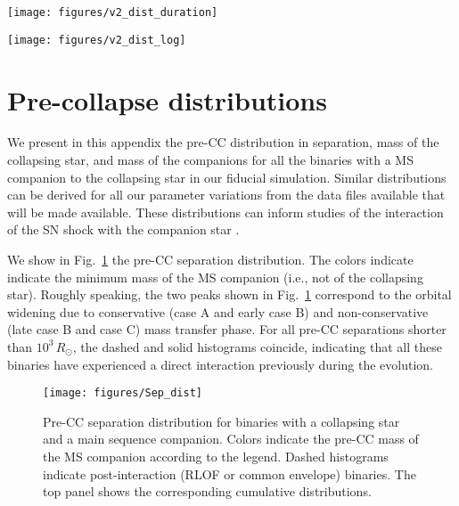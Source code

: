 \documentclass{aa}
\newcommand{\todo}[1]{{\large $\blacksquare$~\textbf{\color{red}[#1]}}~$\blacksquare$}
\DeclareRobustCommand{\Figref}[1]{Fig.~\ref{#1}}
\begin{document}
\begin{figure*}[htbp]
  \texttt{[image: figures/v2\_dist\_duration]}
  \caption{Velocity distribution of ejected stars, including the
    finite MS lifetime to populate the bins (see also
    \Figref{fig:v_dist}). }
  \label{fig:v_dist_obs}
\end{figure*}


\begin{figure*}[bp]
  \texttt{[image: figures/v2\_dist\_log]}
  \caption{Same as \Figref{fig:v_dist}, but using a logarithmic scale
    for the velocity. The use of a logarithmic scale allows for the
    display of a wider range of velocities. A minor peak in the grey
    histogram can be seen between $100\lesssim
    v_\mathrm{dis}/\mathrm{km \ s^{-1}} \lesssim
    400$, but is absent in the histograms for massive ejected
    stars. Such high ejection velocities are reached through a common
    envelope evolution without accreting mass.}
  \label{fig:v_dist_log}
\end{figure*}



\section{Pre-collapse distributions}


We present in this appendix the pre-CC distribution in separation,
mass of the collapsing star, and mass of the companions for all the
binaries with a MS companion to the collapsing star in our fiducial
simulation. Similar distributions can be derived for all our parameter
variations from the data files available that will be made
available.%
These distributions can inform studies of the interaction of the
SN shock with the companion star
\citep[e.g.][]{wheeler:75,liu:15,rimoldi:16, hirai:18}.

We show in \Figref{fig:preCC_sep_dist} the pre-CC separation distribution. The colors indicate indicate the minimum mass of the MS
companion (i.e., not of the collapsing star). Roughly speaking, the
two peaks shown in \Figref{fig:preCC_sep_dist} correspond to the
orbital widening due to conservative (case A and early case B) and
non-conservative (late case B and case C) mass transfer phase. For all
pre-CC separations shorter than $10^3\,R_\odot$, the dashed and solid
histograms coincide, indicating that all these binaries have
experienced a direct interaction previously during the evolution.

\begin{figure}[htbp]
  \texttt{[image: figures/Sep\_dist]}
  \caption{Pre-CC separation distribution for binaries with a
    collapsing star and a main sequence companion. Colors indicate the
    pre-CC mass of the MS companion according to the legend. Dashed
    histograms indicate post-interaction (RLOF or common envelope)
    binaries. The top panel shows the corresponding cumulative
    distributions.}
  \label{fig:preCC_sep_dist}
\end{figure}
\end{document}
